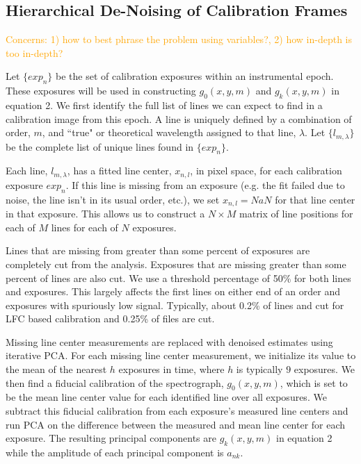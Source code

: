 \documentclass[12pt, letterpaper]{article}
\newcommand{\lz}[1]{\textcolor{orange}{#1}}
\begin{document}
\subsection{Hierarchical De-Noising of Calibration Frames} \label{sec:denoising}
\lz{Concerns: 1) how to best phrase the problem using variables?, 2) how in-depth is too in-depth?}

Let $\{exp_n\}$ be the set of calibration exposures within an instrumental epoch.  These exposures will be used in constructing $g_0(x,y,m)$ and $g_k(x,y,m)$ in equation 2.  We first identify the full list of lines we can expect to find in a calibration image from this epoch.  A line is uniquely defined by a combination of order, $m$, and ``true" or theoretical wavelength assigned to that line, $\lambda$.  Let $\{l_{m,\lambda}\}$ be the complete list of unique lines found in $\{exp_n\}$.

Each line, $l_{m,\lambda}$, has a fitted line center, $x_{n,l}$, in pixel space, for each calibration exposure $exp_n$.  If this line is missing from an exposure (e.g. the fit failed due to noise, the line isn't in its usual order, etc.), we set $x_{n,l} = NaN$ for that line center in that exposure.  This allows us to construct a $N \times M$ matrix of line positions for each of $M$ lines for each of $N$ exposures.

Lines that are missing from greater than some percent of exposures are completely cut from the analysis.  Exposures that are missing greater than some percent of lines are also cut.  We use a threshold percentage of 50\% for both lines and exposures.  This largely affects the first lines on either end of an order and exposures with spuriously low signal.  Typically, about 0.2\% of lines and cut for LFC based calibration and 0.25\% of files are cut.

Missing line center measurements are replaced with denoised estimates using iterative PCA.  For each missing line center measurement, we initialize its value to the mean of the nearest $h$ exposures in time, where $h$ is typically $9$ exposures.  We then find a fiducial calibration of the spectrograph,  $g_0(x,y,m)$, which is set to be the mean line center value for each identified line over all exposures.  We subtract this fiducial calibration from each exposure's measured line centers and run PCA on the difference between the measured and mean line center for each exposure.  The resulting principal components are $g_k(x,y,m)$ in equation 2 while the amplitude of each principal component is $a_{nk}$.
\end{document}
